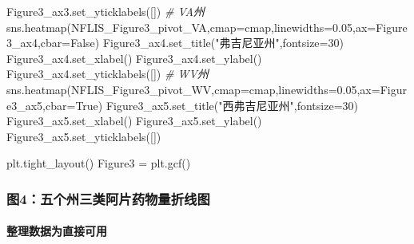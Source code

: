 \documentclass[
]{article}
\newenvironment{Shaded}{}{}
\newcommand{\CommentTok}[1]{\textcolor[rgb]{0.38,0.63,0.69}{\textit{#1}}}
\newcommand{\DecValTok}[1]{\textcolor[rgb]{0.25,0.63,0.44}{#1}}
\newcommand{\FloatTok}[1]{\textcolor[rgb]{0.25,0.63,0.44}{#1}}
\newcommand{\NormalTok}[1]{#1}
\newcommand{\OperatorTok}[1]{\textcolor[rgb]{0.40,0.40,0.40}{#1}}
\newcommand{\StringTok}[1]{\textcolor[rgb]{0.25,0.44,0.63}{#1}}
\newcommand{\VariableTok}[1]{\textcolor[rgb]{0.10,0.09,0.49}{#1}}
\begin{document}
\begin{Shaded}
\begin{Highlighting}[]
\NormalTok{Figure3\_ax3.set\_yticklabels([])}
\CommentTok{\# VA州}
\NormalTok{sns.heatmap(NFLIS\_Figure3\_pivot\_VA,cmap}\OperatorTok{=}\NormalTok{cmap,linewidths}\OperatorTok{=}\FloatTok{0.05}\NormalTok{,ax}\OperatorTok{=}\NormalTok{Figure3\_ax4,cbar}\OperatorTok{=}\VariableTok{False}\NormalTok{)}
\NormalTok{Figure3\_ax4.set\_title(}\StringTok{"弗吉尼亚州"}\NormalTok{,fontsize}\OperatorTok{=}\DecValTok{30}\NormalTok{)}
\NormalTok{Figure3\_ax4.set\_xlabel(}\StringTok{\textquotesingle{}\textquotesingle{}}\NormalTok{)}
\NormalTok{Figure3\_ax4.set\_ylabel(}\StringTok{\textquotesingle{}\textquotesingle{}}\NormalTok{)}
\NormalTok{Figure3\_ax4.set\_yticklabels([])}
\CommentTok{\# WV州}
\NormalTok{sns.heatmap(NFLIS\_Figure3\_pivot\_WV,cmap}\OperatorTok{=}\NormalTok{cmap,linewidths}\OperatorTok{=}\FloatTok{0.05}\NormalTok{,ax}\OperatorTok{=}\NormalTok{Figure3\_ax5,cbar}\OperatorTok{=}\VariableTok{True}\NormalTok{)}
\NormalTok{Figure3\_ax5.set\_title(}\StringTok{"西弗吉尼亚州"}\NormalTok{,fontsize}\OperatorTok{=}\DecValTok{30}\NormalTok{)}
\NormalTok{Figure3\_ax5.set\_xlabel(}\StringTok{\textquotesingle{}\textquotesingle{}}\NormalTok{)}
\NormalTok{Figure3\_ax5.set\_ylabel(}\StringTok{\textquotesingle{}\textquotesingle{}}\NormalTok{)}
\NormalTok{Figure3\_ax5.set\_yticklabels([])}

\NormalTok{plt.tight\_layout()}
\NormalTok{Figure3 }\OperatorTok{=}\NormalTok{ plt.gcf()}
\end{Highlighting}
\end{Shaded}

\hypertarget{header-n250}{%
\subsubsection{图4：五个州三类阿片药物量折线图}\label{header-n250}}

\hypertarget{header-n251}{%
\paragraph{整理数据为直接可用}\label{header-n251}}
\end{document}
